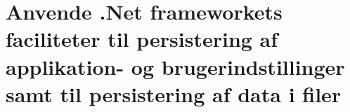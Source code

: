 \section{Anvende .Net frameworkets faciliteter til persistering af applikation- og brugerindstillinger samt til persistering af data i filer}\label{sec:spm6}